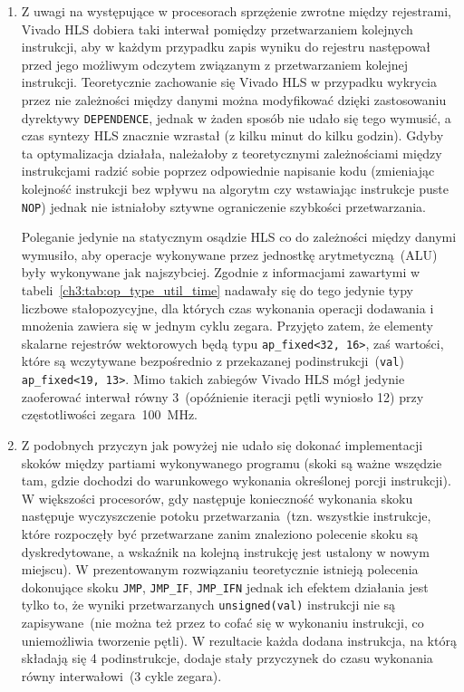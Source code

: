 \begin{enumerate}
\item Z uwagi na występujące w procesorach sprzężenie zwrotne między rejestrami, Vivado HLS dobiera taki interwał pomiędzy przetwarzaniem kolejnych instrukcji, aby w każdym przypadku zapis wyniku do rejestru następował przed jego możliwym odczytem związanym z przetwarzaniem kolejnej instrukcji. Teoretycznie zachowanie się Vivado HLS w przypadku wykrycia przez nie zależności między danymi można modyfikować dzięki zastosowaniu dyrektywy \texttt{DEPENDENCE}, jednak w żaden sposób nie udało się tego wymusić, a czas syntezy HLS znacznie wzrastał (z kilku minut do kilku godzin). Gdyby ta optymalizacja działała, należałoby z teoretycznymi zależnościami między instrukcjami radzić sobie poprzez odpowiednie napisanie kodu (zmieniając kolejność instrukcji bez wpływu na algorytm czy wstawiając instrukcje puste \texttt{NOP}) jednak nie istniałoby sztywne ograniczenie szybkości przetwarzania. 

Poleganie jedynie na statycznym osądzie HLS co do zależności między danymi wymusiło, aby operacje wykonywane przez jednostkę arytmetyczną~(ALU) były wykonywane jak najszybciej. Zgodnie z informacjami zawartymi w tabeli~\ref{ch3:tab:op_type_util_time} nadawały się do tego jedynie typy liczbowe stałopozycyjne, dla których czas wykonania operacji dodawania i mnożenia zawiera się w jednym cyklu zegara. Przyjęto zatem, że elementy skalarne rejestrów wektorowych będą typu \texttt{ap\_fixed<32, 16>}, zaś wartości, które są wczytywane bezpośrednio z przekazanej podinstrukcji~(\texttt{val}) \texttt{ap\_fixed<19, 13>}. Mimo takich zabiegów Vivado HLS mógł jedynie zaoferować interwał równy 3~(opóźnienie iteracji pętli wyniosło 12) przy częstotliwości zegara~100~MHz. 

\item Z podobnych przyczyn jak powyżej nie udało się dokonać implementacji skoków między partiami wykonywanego programu (skoki są ważne wszędzie tam, gdzie dochodzi do warunkowego wykonania określonej porcji instrukcji). W większości procesorów, gdy następuje konieczność wykonania skoku następuje wyczyszczenie potoku przetwarzania~(tzn. wszystkie instrukcje, które rozpoczęły być przetwarzane zanim znaleziono polecenie skoku są dyskredytowane, a wskaźnik na kolejną instrukcję jest ustalony w nowym miejscu). W prezentowanym rozwiązaniu teoretycznie istnieją polecenia dokonujące skoku \texttt{JMP}, \texttt{JMP\_IF}, \texttt{JMP\_IFN} jednak ich efektem działania jest tylko to, że wyniki przetwarzanych \texttt{unsigned(val)} instrukcji nie są zapisywane~(nie można też przez to cofać się w wykonaniu instrukcji, co uniemożliwia tworzenie pętli). W rezultacie każda dodana instrukcja, na którą składają się 4 podinstrukcje, dodaje stały przyczynek do czasu wykonania równy interwałowi~(3 cykle zegara). 


\end{enumerate}

